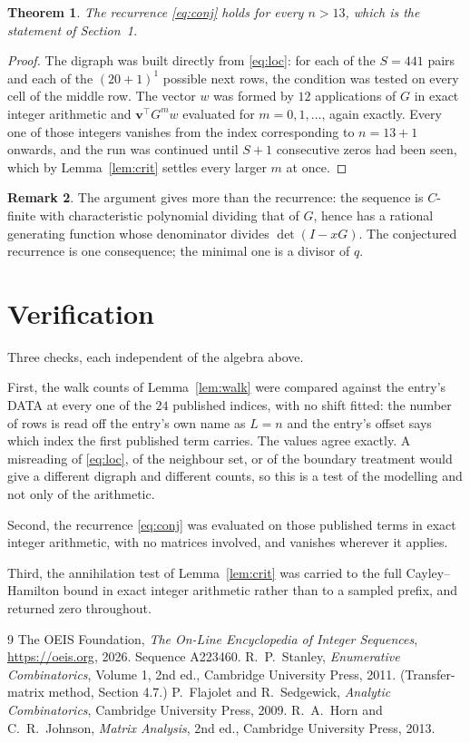 \documentclass[11pt,a4paper]{article}
\theoremstyle{plain}
\newtheorem{theorem}{Theorem}
\theoremstyle{definition}
\newtheorem{remark}[theorem]{Remark}
\begin{document}
\begin{theorem}
The recurrence \eqref{eq:conj} holds for every $n>13$, which is the statement of
Section~1.
\end{theorem}

\begin{proof}
The digraph was built directly from \eqref{eq:loc}: for each of the $S=441$ pairs and each
of the $(20+1)^{1}$ possible next rows, the condition was tested on every cell of
the middle row. The vector $w$ was formed by $12$ applications of $G$ in exact integer
arithmetic and $\mathbf{v}^{\!\top}G^{m}w$ evaluated for $m=0,1,\dots$, again exactly.
Every one of those integers vanishes from the index corresponding to $n=13+1$ onwards,
and the run was continued until $S+1$ consecutive zeros had been seen, which by
Lemma~\ref{lem:crit} settles every larger $m$ at once.
\end{proof}

\begin{remark}
The argument gives more than the recurrence: the sequence is $C$-finite with characteristic
polynomial dividing that of $G$, hence has a rational generating function whose denominator
divides $\det(I-xG)$. The conjectured recurrence is one consequence; the minimal one is a
divisor of $q$.
\end{remark}

\section{Verification}

Three checks, each independent of the algebra above.

First, the walk counts of Lemma~\ref{lem:walk} were compared against the entry's DATA at
every one of the $24$ published indices, with no shift fitted: the number of rows is
read off the entry's own name as $L=n$ and the entry's offset says which index the first
published term carries. The values agree exactly. A misreading of \eqref{eq:loc}, of the
neighbour set, or of the boundary treatment would give a different digraph and different
counts, so this is a test of the modelling and not only of the arithmetic.

Second, the recurrence \eqref{eq:conj} was evaluated on those published terms in exact
integer arithmetic, with no matrices involved, and vanishes wherever it applies.

Third, the annihilation test of Lemma~\ref{lem:crit} was carried to the full
Cayley--Hamilton bound in exact integer arithmetic rather than to a sampled prefix, and
returned zero throughout.

\begin{thebibliography}{9}
 The OEIS Foundation, \emph{The On-Line Encyclopedia of Integer
Sequences}, \url{https://oeis.org}, 2026. Sequence A223460.
 R.~P.~Stanley, \emph{Enumerative Combinatorics}, Volume 1, 2nd ed.,
Cambridge University Press, 2011. (Transfer-matrix method, Section 4.7.)
 P.~Flajolet and R.~Sedgewick, \emph{Analytic Combinatorics}, Cambridge
University Press, 2009.
 R.~A.~Horn and C.~R.~Johnson, \emph{Matrix Analysis}, 2nd ed., Cambridge
University Press, 2013.
\end{thebibliography}
\end{document}
